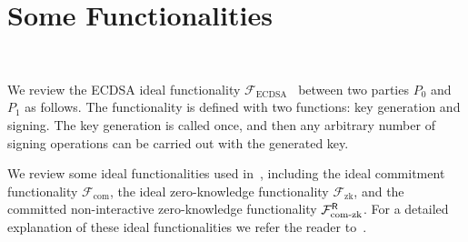 \documentclass{llncs}
\begin{document}
\section{Some Functionalities}~\label{Some Functionalities}

We review the ECDSA ideal functionality $\mathcal{F}_{\text{ECDSA}}$~\cite{Lin17} between two parties $P_0$ and $P_1$ as follows. The functionality is defined with two functions: key generation and signing. The key generation is called once, and then any arbitrary number of signing operations can be carried out with the generated key.

\begin{center}
\end{center}

We review some ideal functionalities used in~\cite{Lin17,CCLST19}, including the ideal commitment functionality $\mathcal{F}_{\text{com}}$, the ideal zero-knowledge functionality $\mathcal{F}_{\text{zk}}$, and the committed non-interactive zero-knowledge functionality $\mathcal{F}^\mathsf{R}_{\text{com\text{-}zk}}$. For a detailed explanation of these ideal functionalities we refer the reader to~\cite{Lin17}.
\end{document}
